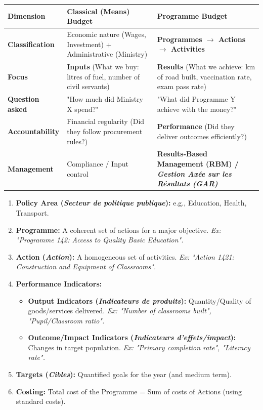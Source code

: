 \documentclass[11pt]{article}
\begin{document}
\begin{center}
\begin{tabularx}{\linewidth}{|l|X|X|}
\hline
\rowcolor{popblueL}
\textbf{Dimension} & \textbf{Classical (Means) Budget} & \textbf{Programme Budget} \\
\hline
\textbf{Classification} & Economic nature (Wages, Investment) + Administrative (Ministry) & \textbf{Programmes $\to$ Actions $\to$ Activities} \\
\hline
\textbf{Focus} & \textbf{Inputs} (What we buy: litres of fuel, number of civil servants) & \textbf{Results} (What we achieve: km of road built, vaccination rate, exam pass rate) \\
\hline
\textbf{Question asked} & "How much did Ministry X spend?" & "What did Programme Y achieve with the money?" \\
\hline
\textbf{Accountability} & Financial regularity (Did they follow procurement rules?) & \textbf{Performance} (Did they deliver outcomes efficiently?) \\
\hline
\textbf{Management} & Compliance / Input control & \textbf{Results-Based Management (RBM) / \emph{Gestion Axée sur les Résultats (GAR)}} \\
\hline
\end{tabularx}
\end{center}

\begin{propriete}
\begin{enumerate}
    \item \textbf{Policy Area (\emph{Secteur de politique publique}):} e.g., Education, Health, Transport.
    \item \textbf{Programme:} A coherent set of actions for a major objective. \textit{Ex: "Programme 142: Access to Quality Basic Education".}
    \item \textbf{Action (\emph{Action}):} A homogeneous set of activities. \textit{Ex: "Action 1421: Construction and Equipment of Classrooms".}
    \item \textbf{Performance Indicators:}
        \begin{itemize}
            \item \textbf{Output Indicators (\emph{Indicateurs de produits}):} Quantity/Quality of goods/services delivered. \textit{Ex: "Number of classrooms built", "Pupil/Classroom ratio".}
            \item \textbf{Outcome/Impact Indicators (\emph{Indicateurs d'effets/impact}):} Changes in target population. \textit{Ex: "Primary completion rate", "Literacy rate".}
        \end{itemize}
    \item \textbf{Targets (\emph{Cibles}):} Quantified goals for the year (and medium term).
    \item \textbf{Costing:} Total cost of the Programme = Sum of costs of Actions (using standard costs).
\end{enumerate}
\end{propriete}
\end{document}
